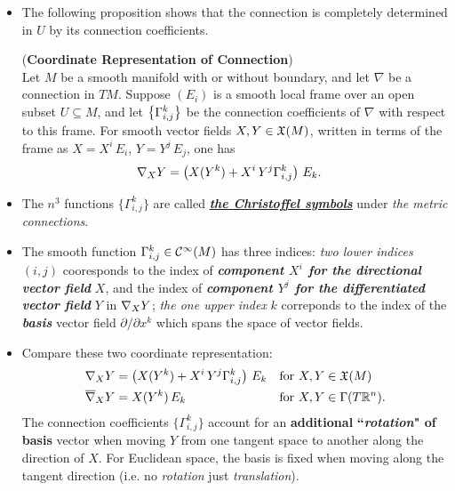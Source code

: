 \documentclass[11pt]{article}
\begin{document}
\begin{itemize}
\item The following proposition shows that the connection is completely determined in $U$ by its connection coefficients. 
\begin{proposition} (\textbf{Coordinate Representation of Connection}) \citep{lee2018introduction}\\
Let $M$ be a smooth manifold with or without boundary, and let $\nabla$ be a connection in $TM$. Suppose $(E_i)$ is a smooth local frame over an open subset $U\subseteq M$, and let $\left\{\Gamma_{i,j}^{k}\right\}$ be the connection coefficients of $\nabla$ with respect to this frame. For smooth vector fields $X, Y  \in {\mathfrak X}(M)$, written in terms of the frame as $X = X^i\,E_i$, $Y = Y^j\,E_j$, one has
\begin{align}
\nabla_{X}{Y} &= \left(X(Y^k) + X^i\,Y^j \Gamma_{i,j}^{k} \right)\,E_k. \label{eqn: connection_represent_christoffel_symbol}
\end{align}
\end{proposition}

\item \begin{remark}
The $n^3$ functions $\{\Gamma_{i,j}^{k}\}$ are called \underline{\emph{\textbf{the Christoffel symbols}}} under \emph{the metric connections}. \citep{do1976differential}
\end{remark}

\item \begin{remark}
The smooth function $\Gamma_{i,j}^{k} \in {\mathcal C}^{\infty}(M)$ has three indices: \emph{two lower indices} $(i,j)$ cooresponds to the index of \emph{\textbf{component $X^i$ for the directional vector field}} $X$, and the index of \emph{\textbf{component $Y^j$ for the differentiated vector field}} $Y$ in $\nabla_{X}{Y}$; \emph{the one upper index} $k$ correponds to the index of the \emph{\textbf{basis}} vector field $\partial/ \partial x^k$ which spans the space of vector fields. 
\end{remark}

\item \begin{remark}
Compare these two coordinate representation:
\begin{align*}
\nabla_{X}{Y} &= \left(X(Y^k) + X^i\,Y^j \Gamma_{i,j}^{k} \right)\,E_k &&\text{for }X, Y \in {\mathfrak X}(M)\\
\overline{\nabla}_{X}{Y} &=X(Y^k) \,E_k  &&\text{for }X, Y \in \Gamma(T{\mathbb R}^{n}).
\end{align*} The connection coefficients $\{\Gamma_{i,j}^{k}\}$ account for an \textbf{additional} \textbf{``\emph{rotation}" of basis} vector when moving $Y$ from one tangent space to another along the direction of $X$. For Euclidean space, the basis is fixed when moving along the tangent direction (i.e. no \emph{rotation} just \emph{translation}).
\end{remark}


\end{itemize}
\end{document}

